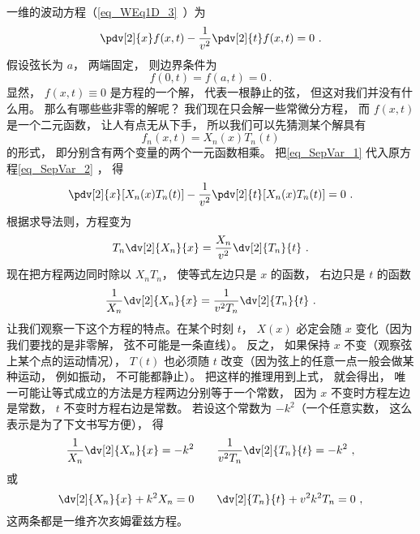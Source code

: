 一维的波动方程（\autoref{eq_WEq1D_3}~）为
\begin{equation}
\pdv[2]{x} f(x, t) - \frac{1}{v^2} \pdv[2]{t}f(x, t) = 0~.
\end{equation}
假设弦长为 $a$， 两端固定， 则边界条件为
\begin{equation}\label{eq_SepVar_3}
f(0, t) = f(a, t) = 0~.
\end{equation}
显然， $f(x, t) \equiv 0$ 是方程的一个解， 代表一根静止的弦， 但这对我们并没有什么用。 那么有哪些些非零的解呢？ 我们现在只会解一些常微分方程， 而 $f(x, t)$ 是一个二元函数， 让人有点无从下手， 所以我们可以先猜测某个解具有
\begin{equation}\label{eq_SepVar_1}
f_n(x, t) = X_n(x) T_n(t)
\end{equation}
的形式， 即分别含有两个变量的两个一元函数相乘。 把\autoref{eq_SepVar_1} 代入原方程\autoref{eq_SepVar_2} ， 得
\begin{equation}
\pdv[2]{x}[X_n(x)T_n(t)] - \frac{1}{v^2}\pdv[2]{t} [X_n(x) T_n(t)] = 0~.
\end{equation}
根据求导法则，方程变为
\begin{equation}
T_n\dv[2]{X_n}{x} = \frac{X_n}{v^2} \dv[2]{T_n}{t}~.
\end{equation}
现在把方程两边同时除以 $X_nT_n$， 使等式左边只是 $x$ 的函数， 右边只是 $t$ 的函数
\begin{equation}
\frac{1}{X_n}\dv[2]{X_n}{x} = \frac{1}{v^2 T_n} \dv[2]{T_n}{t}~.
\end{equation}
让我们观察一下这个方程的特点。在某个时刻 $t$， $X(x)$ 必定会随 $x$ 变化（因为我们要找的是非零解， 弦不可能是一条直线）。 反之， 如果保持 $x$ 不变（观察弦上某个点的运动情况）， $T(t)$ 也必须随 $t$ 改变（因为弦上的任意一点一般会做某种运动， 例如振动， 不可能都静止）。 把这样的推理用到上式， 就会得出， 唯一可能让等式成立的方法是方程两边分别等于一个常数， 因为 $x$ 不变时方程左边是常数，  $t$ 不变时方程右边是常数。 若设这个常数为 $-k^2$（一个任意实数， 这么表示是为了下文书写方便）， 得
\begin{equation}
\frac{1}{X_n}\dv[2]{X_n}{x} = -k^2
\qquad
\frac{1}{v^2 T_n}\dv[2]{T_n}{t} = -k^2~,
\end{equation}
或
\begin{equation}
\dv[2]{X_n}{x} + k^2 X_n = 0
\qquad
\dv[2]{T_n}{t} + v^2k^2 T_n = 0~,
\end{equation}
这两条都是一维齐次亥姆霍兹方程。

